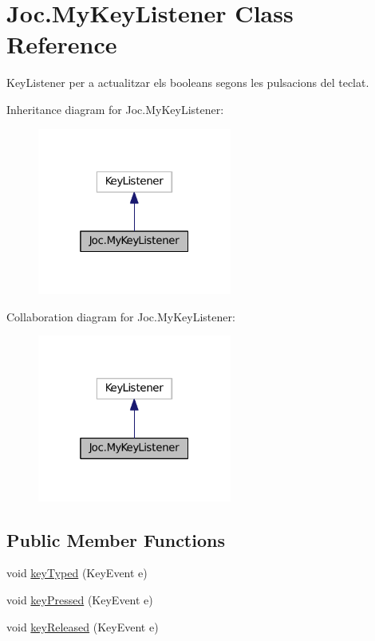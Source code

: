 \hypertarget{class_joc_1_1_my_key_listener}{}\section{Joc.\+My\+Key\+Listener Class Reference}
\label{class_joc_1_1_my_key_listener}


Key\+Listener per a actualitzar els booleans segons les pulsacions del teclat.  




Inheritance diagram for Joc.\+My\+Key\+Listener\+:\nopagebreak
\begin{figure}[H]
\begin{center}
\leavevmode
\includegraphics[width=181pt]{class_joc_1_1_my_key_listener__inherit__graph}
\end{center}
\end{figure}


Collaboration diagram for Joc.\+My\+Key\+Listener\+:\nopagebreak
\begin{figure}[H]
\begin{center}
\leavevmode
\includegraphics[width=181pt]{class_joc_1_1_my_key_listener__coll__graph}
\end{center}
\end{figure}
\subsection*{Public Member Functions}
\begin{DoxyCompactItemize}
\item 
void \hyperlink{class_joc_1_1_my_key_listener_a4ca06e4f3950c3745be88c484f12df85}{key\+Typed} (Key\+Event e)
\item 
void \hyperlink{class_joc_1_1_my_key_listener_a14addef50fc960bcd8e4ce5cc3d9c643}{key\+Pressed} (Key\+Event e)
\item 
void \hyperlink{class_joc_1_1_my_key_listener_af5f550e0c17018b1bce4648782aaa9fb}{key\+Released} (Key\+Event e)
\end{DoxyCompactItemize}


